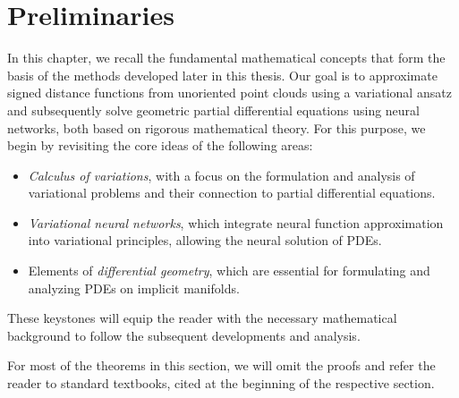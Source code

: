 \documentclass[12pt,openany]{book}
\theoremstyle{plainnormal}
\theoremstyle{remark}
\begin{document}
\chapter{Preliminaries}\label{ch:prelim}
In this chapter, we recall the fundamental mathematical concepts that form the basis of the methods developed later in this thesis. Our goal is to approximate signed distance functions from unoriented point clouds using a variational ansatz and subsequently solve geometric partial differential equations using neural networks, both based on rigorous mathematical theory. For this purpose, we begin by revisiting the core ideas of the following areas:
\begin{itemize}
    \item \emph{Calculus of variations}, with a focus on the formulation and analysis of variational problems and their connection to partial differential equations.
    
    \item \emph{Variational neural networks}, which integrate neural function approximation into variational principles, allowing the neural solution of PDEs.
    
    \item Elements of \emph{differential geometry}, which are essential for formulating and analyzing PDEs on implicit manifolds.
\end{itemize}
These keystones will equip the reader with the necessary mathematical background to follow the subsequent developments and analysis.\par
For most of the theorems in this section, we will omit the proofs and refer the reader to standard textbooks, cited at the beginning of the respective section.
\end{document}
